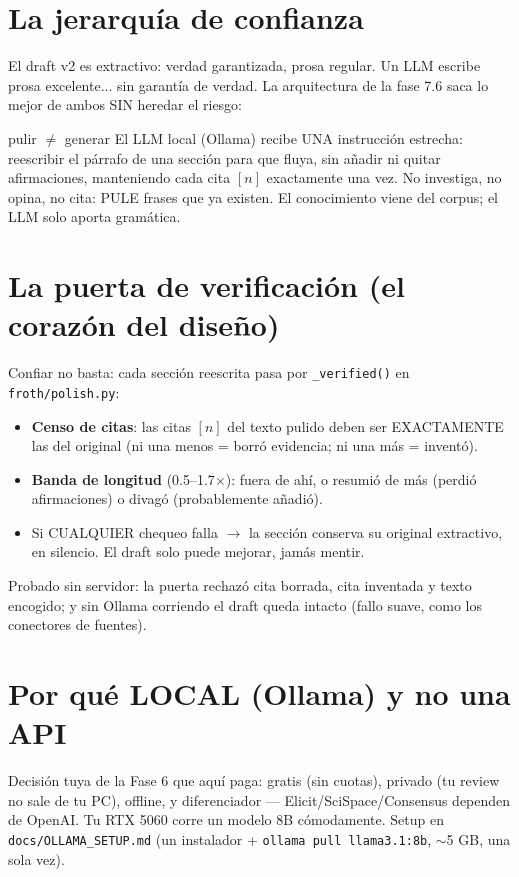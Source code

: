 \documentclass[11pt,a4paper]{article}
\begin{document}
\section{La jerarquía de confianza}

El draft v2 es extractivo: verdad garantizada, prosa regular. Un LLM escribe prosa
excelente... sin garantía de verdad. La arquitectura de la fase 7.6 saca lo mejor de
ambos SIN heredar el riesgo:

\begin{concepto}{pulir $\neq$ generar}
El LLM local (Ollama) recibe UNA instrucción estrecha: reescribir el párrafo de una
sección para que fluya, sin añadir ni quitar afirmaciones, manteniendo cada cita $[n]$
exactamente una vez. No investiga, no opina, no cita: PULE frases que ya existen.
El conocimiento viene del corpus; el LLM solo aporta gramática.
\end{concepto}

\section{La puerta de verificación (el corazón del diseño)}

Confiar no basta: cada sección reescrita pasa por \texttt{\_verified()} en
\texttt{froth/polish.py}:

\begin{itemize}
  \item \textbf{Censo de citas}: las citas $[n]$ del texto pulido deben ser EXACTAMENTE
        las del original (ni una menos = borró evidencia; ni una más = inventó).
  \item \textbf{Banda de longitud} (0.5--1.7$\times$): fuera de ahí, o resumió de más
        (perdió afirmaciones) o divagó (probablemente añadió).
  \item Si CUALQUIER chequeo falla $\rightarrow$ la sección conserva su original
        extractivo, en silencio. El draft solo puede mejorar, jamás mentir.
\end{itemize}

Probado sin servidor: la puerta rechazó cita borrada, cita inventada y texto encogido;
y sin Ollama corriendo el draft queda intacto (fallo suave, como los conectores de
fuentes).

\section{Por qué LOCAL (Ollama) y no una API}

Decisión tuya de la Fase 6 que aquí paga: gratis (sin cuotas), privado (tu review no
sale de tu PC), offline, y diferenciador — Elicit/SciSpace/Consensus dependen de OpenAI.
Tu RTX 5060 corre un modelo 8B cómodamente. Setup en \texttt{docs/OLLAMA\_SETUP.md}
(un instalador + \texttt{ollama pull llama3.1:8b}, $\sim$5 GB, una sola vez).
\end{document}
